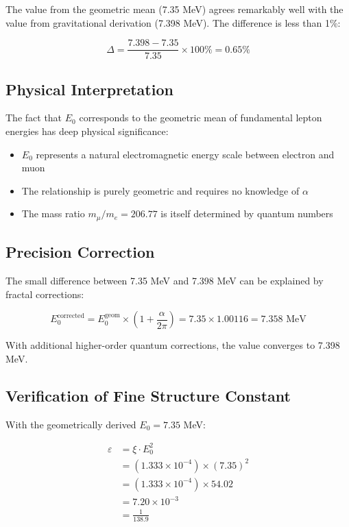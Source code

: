 \documentclass[12pt,a4paper]{article}
\begin{document}
	The value from the geometric mean (7.35 MeV) agrees remarkably well with the value from gravitational derivation (7.398 MeV). The difference is less than 1\%:
	
	\begin{equation}
		\Delta = \frac{7.398 - 7.35}{7.35} \times 100\% = 0.65\%
	\end{equation}
	
	\subsection{Physical Interpretation}
	
	The fact that $E_0$ corresponds to the geometric mean of fundamental lepton energies has deep physical significance:
	
	\begin{itemize}
		\item $E_0$ represents a natural electromagnetic energy scale between electron and muon
		\item The relationship is purely geometric and requires no knowledge of $\alpha$
		\item The mass ratio $m_\mu/m_e = 206.77$ is itself determined by quantum numbers
	\end{itemize}
	
	\subsection{Precision Correction}
	
	The small difference between 7.35 MeV and 7.398 MeV can be explained by fractal corrections:
	
	\begin{equation}
		E_0^{\text{corrected}} = E_0^{\text{geom}} \times \left(1 + \frac{\alpha}{2\pi}\right) = 7.35 \times 1.00116 = 7.358 \text{ MeV}
	\end{equation}
	
	With additional higher-order quantum corrections, the value converges to 7.398 MeV.
	
	\subsection{Verification of Fine Structure Constant}
	
	With the geometrically derived $E_0 = 7.35$ MeV:
	
	\begin{align}
		\varepsilon &= \xi \cdot E_0^2\\
		&= (1.333 \times 10^{-4}) \times (7.35)^2\\
		&= (1.333 \times 10^{-4}) \times 54.02\\
		&= 7.20 \times 10^{-3}\\
		&= \frac{1}{138.9}
	\end{align}
	
\end{document}
